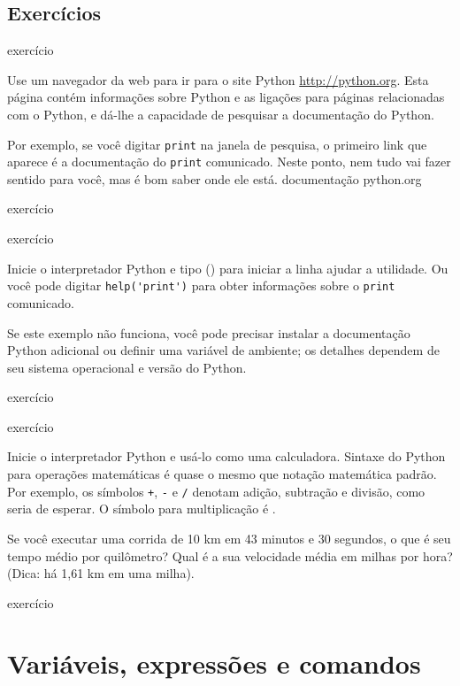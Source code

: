 \documentclass[10pt]{book}
\begin{document}
\section{Exercícios}

\begin{} exercício

Use um navegador da web para ir para o site Python \url{http://python.org}.
Esta página contém informações sobre Python e as ligações
para páginas relacionadas com o Python, e dá-lhe a capacidade de pesquisar
a documentação do Python.

Por exemplo, se você digitar {\tt print} na janela de pesquisa, o
primeiro link que aparece é a documentação do {\tt print}
comunicado. Neste ponto, nem tudo vai fazer sentido para você,
mas é bom saber onde ele está.
\index{} documentação
\index{} python.org

\end{} exercício

\begin{} exercício

Inicie o interpretador Python e tipo {\ttajuda()} para iniciar a linha
ajudar a utilidade. Ou você pode digitar \verb"help('print')" para obter informações
sobre o {\tt print} comunicado.

Se este exemplo não funciona, você
pode precisar instalar a documentação Python adicional ou definir uma
variável de ambiente; os detalhes dependem de seu sistema operacional e
versão do Python.

\end{} exercício

\begin{} exercício

Inicie o interpretador Python e usá-lo como uma calculadora.
Sintaxe do Python para operações matemáticas é quase o mesmo que
notação matemática padrão. Por exemplo, os símbolos
{\tt +}, {\tt -} e {\tt /} denotam adição, subtração
e divisão, como seria de esperar. O símbolo para
multiplicação é {\tt *}.

Se você executar uma corrida de 10 km em 43 minutos e 30 segundos, o que é seu
tempo médio por quilômetro? Qual é a sua velocidade média em milhas por hora?
(Dica: há 1,61 km em uma milha).

\end{} exercício




\chapter{Variáveis, expressões e comandos}
\end{document}
